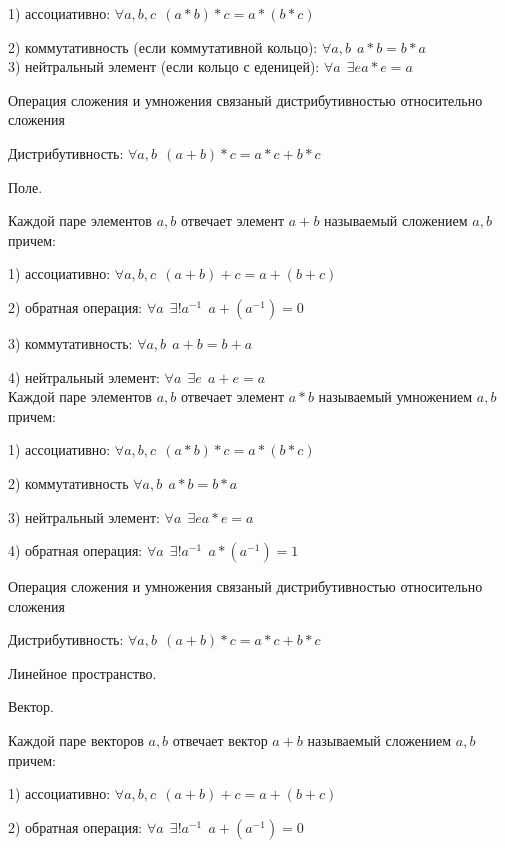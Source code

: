 1) ассоциативно: $\forall a,b,c ~~ (a*b)*c = a*(b*c)$

2) коммутативность (если коммутативной кольцо): $\forall a,b ~~ a*b = b*a$\\

3) нейтральный элемент (если кольцо с еденицей):
$\forall a ~~ \exists e a*e = a$

  Операция сложения и умножения связаный дистрибутивностью относительно сложения

Дистрибутивность: $\forall a,b ~~ (a + b)*c = a*c + b*c$

\begin{title}[\Large]
  Поле.
\end{title}

  Каждой паре элементов $a,b$ отвечает элемент $a+b$ называемый сложением $a,b$
причем:

1) ассоциативно: $\forall a,b,c ~~ (a+b)+c = a+(b+c)$

2) обратная операция: $\forall a ~~ \exists ! a^{-1} ~~ a + (a^{-1}) = 0$

3) коммутативность: $\forall a,b ~~ a+b = b+a$

4) нейтральный элемент: $\forall a ~~ \exists e ~~ a+e = a$\\

  Каждой паре элементов $a,b$ отвечает элемент $a*b$ называемый умножением $a,b$
причем:

1) ассоциативно: $\forall a,b,c ~~ (a*b)*c = a*(b*c)$

2) коммутативность $\forall a,b ~~ a*b = b*a$

3) нейтральный элемент: $\forall a ~~ \exists e a*e = a$

4) обратная операция: $\forall a ~~ \exists ! a^{-1} ~~ a * (a^{-1}) = 1$

  Операция сложения и умножения связаный дистрибутивностью относительно сложения

Дистрибутивность: $\forall a,b ~~ (a + b)*c = a*c + b*c$

\begin{title}[\Large]
  Линейное пространство.
\end{title}

Вектор.

  Каждой паре векторов $a,b$ отвечает вектор $a+b$ называемый сложением $a,b$
причем:

1) ассоциативно: $\forall a,b,c ~~ (a+b)+c = a+(b+c)$

2) обратная операция: $\forall a ~~ \exists ! a^{-1} ~~ a + (a^{-1}) = 0$

